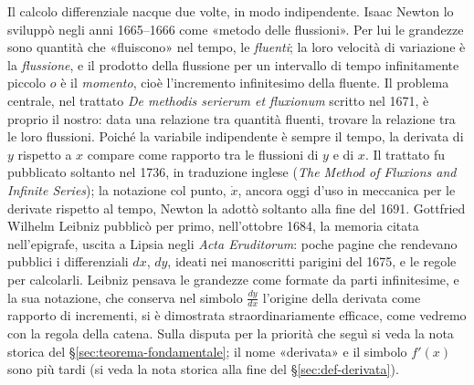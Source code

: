\begin{notastorica}
Il calcolo differenziale nacque due volte, in modo indipendente. Isaac Newton lo
sviluppò negli anni 1665--1666 come «metodo delle flussioni». Per lui le grandezze sono
quantità che «fluiscono» nel tempo, le \emph{fluenti}; la loro velocità di variazione è
la \emph{flussione}, e il prodotto della flussione per un intervallo di tempo
infinitamente piccolo $o$ è il \emph{momento}, cioè l'incremento infinitesimo della
fluente. Il problema centrale, nel trattato \emph{De methodis serierum et fluxionum}
scritto nel 1671, è proprio il nostro: data una relazione tra quantità fluenti, trovare
la relazione tra le loro flussioni. Poiché la variabile indipendente è sempre il tempo,
la derivata di $y$ rispetto a $x$ compare come rapporto tra le flussioni di $y$ e di $x$.
Il trattato fu pubblicato soltanto nel 1736, in traduzione inglese (\emph{The Method of
Fluxions and Infinite Series}); la notazione col punto, $\dot x$, ancora oggi d'uso in
meccanica per le derivate rispetto al tempo, Newton la adottò soltanto alla fine del 1691.
Gottfried Wilhelm Leibniz pubblicò per primo, nell'ottobre 1684, la memoria citata
nell'epigrafe, uscita a Lipsia negli \emph{Acta Eruditorum}: poche pagine che rendevano
pubblici i differenziali $dx$, $dy$, ideati nei manoscritti parigini del 1675, e le regole
per calcolarli. Leibniz pensava le grandezze come formate da parti infinitesime, e la
sua notazione, che conserva nel simbolo $\frac{dy}{dx}$ l'origine della derivata come
rapporto di incrementi, si è dimostrata straordinariamente efficace, come vedremo con la
regola della catena. Sulla disputa per la priorità che seguì si veda la nota storica
del \S\ref{sec:teorema-fondamentale}; il nome «derivata» e il simbolo $f'(x)$ sono più
tardi (si veda la nota storica alla fine del \S\ref{sec:def-derivata}).
\end{notastorica}
